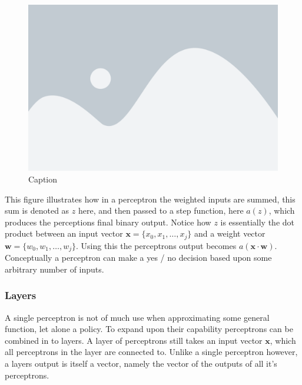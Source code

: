 \begin{figure}[H]
    \centering
    \includegraphics[width=0.6\linewidth]{figures/placeholder.png}
    \caption{Caption}
    \label{fig:my_label}
\end{figure}
\noindent
This figure illustrates how in a perceptron the weighted inputs are summed, this sum is denoted as $z$ here, and then passed to a step function, here $a(z)$, which produces the perceptions final binary output. Notice how $z$ is essentially the dot product between an input vector $\mathbf{x} = \{x_0, x_1, \dots, x_j\}$ and a weight vector $\mathbf{w} = \{ w_0, w_1, \dots, w_j \}$. Using this the perceptrons output becomes $a(\mathbf{x} \cdot \mathbf{w})$. Conceptually a perceptron can make a yes / no decision based upon some arbitrary number of inputs. 

\subsubsection{Layers}\label{subsubsec:nn:comp:layers}
A single perceptron is not of much use when approximating some general function, let alone a policy. To expand upon their capability perceptrons can be combined in to layers. A layer of perceptrons still takes an input vector $\mathbf{x}$, which all perceptrons in the layer are connected to. Unlike a single perceptron however, a layers output is itself a vector, namely the vector of the outputs of all it's perceptrons.

